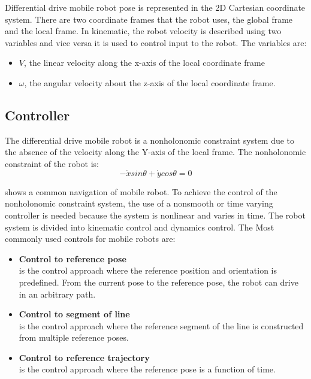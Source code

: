 \hspace{1.27cm}
Differential drive mobile robot pose is represented in the 2D Cartesian coordinate system. There are two coordinate frames that the robot uses, the global frame and the local frame. In kinematic, the robot velocity is described using two variables and vice versa it is used to control input to the robot. The variables are:\par

\begin{itemize}
\item \(V\), the linear velocity along the x-axis of the local coordinate frame
\item \(\omega\), the angular velocity about the z-axis of the local coordinate frame.
\end{itemize}






\break
\subsection{Controller}
\hspace{1.27cm}
The differential drive mobile robot is a nonholonomic constraint system due to the absence of the velocity along the Y-axis of the local frame. 
The nonholonomic constraint of the robot is:
\begin{equation}
-\Dot{x} sin\theta + \Dot{y} cos\theta = 0
\end{equation}

\textbf{\figureautorefname{ \ref{fig:Mobile Robot Navigation}}} shows a common navigation of mobile robot. To achieve the control of the nonholonomic constraint system, the use of a nonsmooth or time varying controller is needed because the system is nonlinear and varies in time. The robot system is divided into kinematic control and dynamics control. The Most commonly used controls for mobile robots are:
\begin{itemize}
\item \textbf{Control to reference pose}\\
is the control approach where the reference position and orientation is predefined. From the current pose to the reference pose, the robot can drive in an arbitrary path.
\item \textbf{Control to segment of line}\\
is the control approach where the reference segment of the line is constructed from multiple reference poses.
\item \textbf{Control to reference trajectory}\\
is the control approach where the reference pose is a function of time. 
\end{itemize}
\par 


